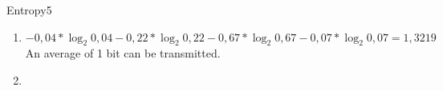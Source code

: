 \begin{questions}
	
	\begin{question}{Entropy}{5}		
	\begin{answer} 
			\begin{enumerate}
		\item \begin{equation}
 - 0,04 * {\log_2 0,04}  - 0,22 * {\log_2 0,22} - 0,67 * {\log_2 0,67} - 0,07 * {\log_2 0,07} = 1,3219   
\end{equation}
An average of 1 bit can be transmitted.
		\item 
		\end{enumerate}
		
	\end{answer}
		
	\end{question}
	
\end{questions}

